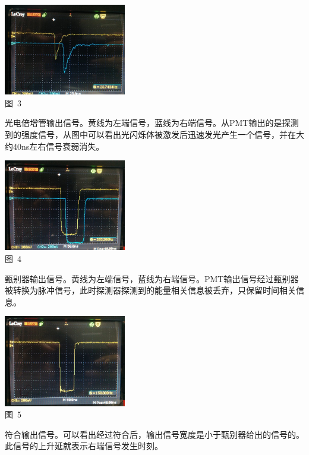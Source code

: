 \documentclass[a4paper,10.0pt,twoside]{npr}
\begin{document}
\begin{multicols}{2}
\begin{center}
   \includegraphics[width=0.4\textwidth]{1.jpg}
\\
\xiaowu\song 图~3\begin{minipage}[t]{75mm} \quad 光电倍增管输出信号。黄线为左端信号，蓝线为右端信号。从PMT输出的是探测到的强度信号，从图中可以看出光闪烁体被激发后迅速发光产生一个信号，并在大约40ns左右信号衰弱消失。\\[-1mm]\wuhao
\end{minipage}
\end{center}
\begin{center}
   \includegraphics[width=0.4\textwidth]{2.jpg}
\\
\xiaowu\song 图~4\begin{minipage}[t]{75mm} \quad 甄别器输出信号。黄线为左端信号，蓝线为右端信号。PMT输出信号经过甄别器被转换为脉冲信号，此时探测器探测到的能量相关信息被丢弃，只保留时间相关信息。\\[-1mm]\wuhao
\end{minipage}
\end{center}
\begin{center}
   \includegraphics[width=0.4\textwidth]{3.jpg}
\\
\xiaowu\song 图~5\begin{minipage}[t]{75mm} \quad 符合输出信号。可以看出经过符合后，输出信号宽度是小于甄别器给出的信号的。此信号的上升延就表示右端信号发生时刻。\\[-1mm]\wuhao

\end{minipage}
\end{center}
\end{multicols}
\end{document}
